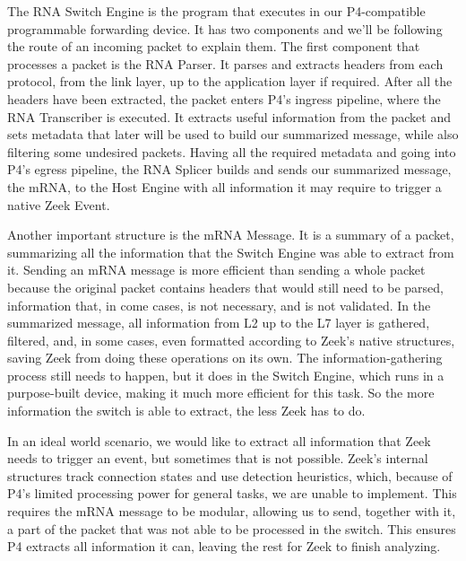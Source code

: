 The RNA Switch Engine is the program that executes in our P4-compatible programmable forwarding device. It has two components and we'll be following the route of an incoming packet to explain them. The first component that processes a packet is the RNA Parser. It parses and extracts headers from each protocol, from the link layer, up to the application layer if required. After all the headers have been extracted, the packet enters P4's ingress pipeline, where the RNA Transcriber is executed. It extracts useful information from the packet and sets metadata that later will be used to build our summarized message, while also filtering some undesired packets. Having all the required metadata and going into P4's egress pipeline, the RNA Splicer builds and sends our summarized message, the mRNA, to the Host Engine with all information it may require to trigger a native Zeek Event.

Another important structure is the mRNA Message. It is a summary of a packet, summarizing all the information that the Switch Engine was able to extract from it. Sending an mRNA message is more efficient than sending a whole packet because the original packet contains headers that would still need to be parsed, information that, in come cases, is not necessary, and is not validated. In the summarized message, all information from L2 up to the L7 layer is gathered, filtered, and, in some cases, even formatted according to Zeek's native structures, saving Zeek from doing these operations on its own. The information-gathering process still needs to happen, but it does in the Switch Engine, which runs in a purpose-built device, making it much more efficient for this task. So the more information the switch is able to extract, the less Zeek has to do.

In an ideal world scenario, we would like to extract all information that Zeek needs to trigger an event, but sometimes that is not possible. Zeek's internal structures track connection states and use detection heuristics, which, because of P4's limited processing power for general tasks, we are unable to implement. This requires the mRNA message to be modular, allowing us to send, together with it, a part of the packet that was not able to be processed in the switch. This ensures P4 extracts all information it can, leaving the rest for Zeek to finish analyzing.

% 
